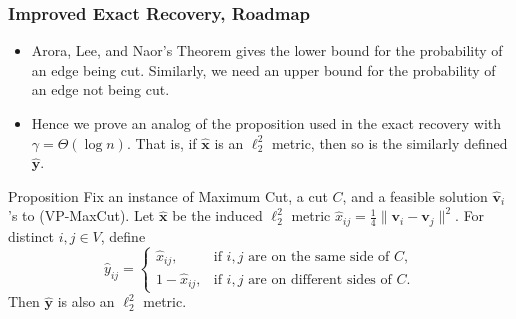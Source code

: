 \documentclass{beamer}
\begin{document}
    \begin{frame}
        \frametitle{Improved Exact Recovery, Roadmap}
    
        \begin{itemize}
            \item Arora, Lee, and Naor's Theorem gives the lower bound for the probability of an edge being cut. Similarly, we need an upper bound for the probability of an edge not being cut. \pause
            \item Hence we prove an analog of the proposition used in the exact recovery with $\gamma = \Theta(\log n)$. That is, if $\mathbf{\hat x}$ is an $\ell_2^2$ metric, then so is the similarly defined $\mathbf{\hat y}$.
        \end{itemize}

        \pause

        \begin{block}{Proposition}
            Fix an instance of {\sc Maximum Cut}, a cut $C$, and a feasible solution $\mathbf{\hat v}_i$'s to {\sc (VP-MaxCut)}. Let $\mathbf{\hat x}$ be the induced $\ell_2^2$ metric $\hat x_{ij} = \frac{1}{4} \lVert \mathbf v_i - \mathbf v_j \rVert^2$. For distinct $i, j \in V$, define
            $$ \hat y_{ij} = \left\{
                \begin{array}{ll}
                    \hat x_{ij}, & \text{if $i, j$ are on the same side of $C$}, \\
                    1 - \hat x_{ij}, & \text{if $i, j$ are on different sides of $C$}.
                \end{array}
            \right. $$
            Then $\mathbf {\hat y}$ is also an $\ell_2^2$ metric.
        \end{block}
    \end{frame}
\end{document}
